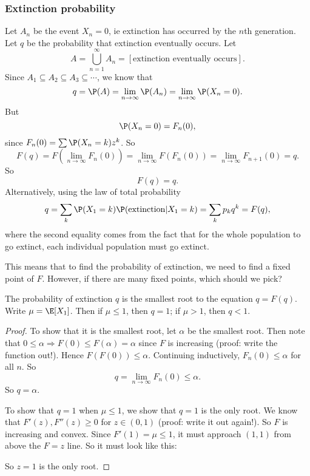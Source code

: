 \documentclass[a4paper]{article}
\begin{document}
\subsubsection*{Extinction probability}
Let $A_n$ be the event $X_n = 0$, ie extinction has occurred by the $n$th generation. Let $q$ be the probability that extinction eventually occurs. Let
\[
  A = \bigcup_{n = 1}^\infty A_n = [\text{extinction eventually occurs}].
\]
Since $A_1 \subseteq A_2 \subseteq A_3 \subseteq \cdots$, we know that
\[
  q = \P(A) = \lim_{n\to \infty} \P(A_n) = \lim_{n \to \infty} \P(X_n = 0).
\]
But
\[
  \P(X_n = 0) = F_n(0),
\]
since $F_n(0) = \sum \P(X_n = k)z^k$. So
\[
  F(q) = F\left(\lim_{n\to \infty} F_n(0)\right) = \lim_{n\to \infty} F(F_n(0)) = \lim_{n\to \infty}F_{n + 1}(0) = q.
\]
So
\[
  F(q) = q.
\]
Alternatively, using the law of total probability
\[
  q = \sum_k \P(X_1 = k) \P(\text{extinction}|X_1 = k) = \sum_k p_k q^k = F(q),
\]
where the second equality comes from the fact that for the whole population to go extinct, each individual population must go extinct.

This means that to find the probability of extinction, we need to find a fixed point of $F$. However, if there are many fixed points, which should we pick?

\begin{thm}
  The probability of extinction $q$ is the smallest root to the equation $q = F(q)$. Write $\mu = \E[X_1]$. Then if $\mu \leq 1$, then $q = 1$; if $\mu > 1$, then $q < 1$.
\end{thm}

\begin{proof}
  To show that it is the smallest root, let $\alpha$ be the smallest root. Then note that $0 \leq \alpha \Rightarrow F(0) \leq F(\alpha) = \alpha$ since $F$ is increasing (proof: write the function out!). Hence $F(F(0)) \leq \alpha$. Continuing inductively, $F_n(0) \leq \alpha$ for all $n$. So
  \[
    q = \lim_{n \to \infty}F_n(0) \leq \alpha.
  \]
  So $q = \alpha$.

  To show that $q = 1$ when $\mu \leq 1$, we show that $q = 1$ is the only root. We know that $F'(z), F''(z) \geq 0$ for $z\in (0, 1)$ (proof: write it out again!). So $F$ is increasing and convex. Since $F'(1) = \mu \leq 1$, it must approach $(1, 1)$ from above the $F = z$ line. So it must look like this:
  \begin{center}
  \end{center}
  So $z = 1$ is the only root.
\end{proof}
\end{document}
